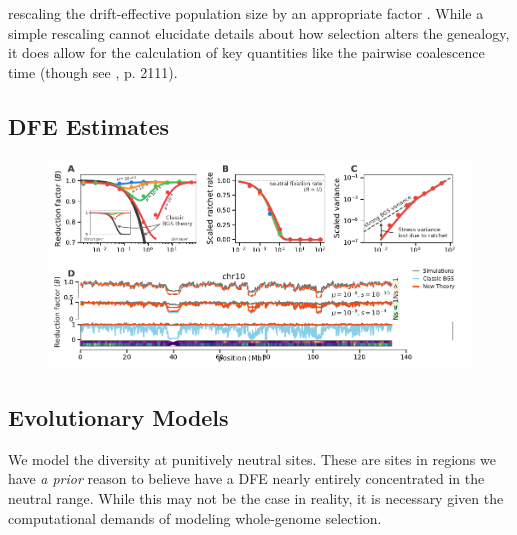 \documentclass[11pt]{article}
\begin{document}
rescaling the drift-effective population size by an appropriate factor
\parencite{Robertson1961-ho,Santiago1995-hx,Santiago1998-bs,Barton2000-zg}.
While a simple rescaling cannot elucidate details about how selection alters
the genealogy, it does allow for the calculation of key quantities like the
pairwise coalescence time (though see \textcite{Santiago1998-bs}, p. 2111).



 
\subsection*{DFE Estimates}

\begin{figure}[!htb]
  \centering
  \includegraphics{figures/figure1.pdf}
  \caption{}
  \label{fig:figure-1}
\end{figure}


\subsection*{Evolutionary Models}

We model the diversity at punitively neutral sites. These are sites in regions
we have \emph{a prior} reason to believe have a DFE nearly entirely
concentrated in the neutral range. While this may not be the case in reality,
it is necessary given the computational demands of modeling whole-genome
selection. 
\end{document}
